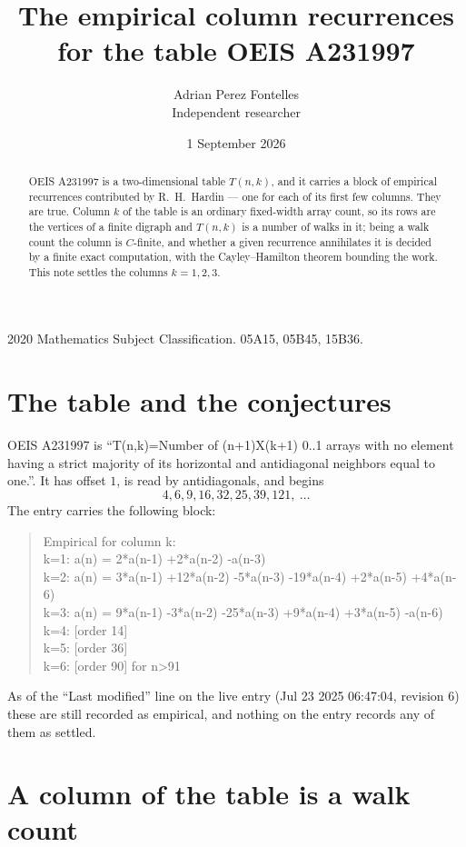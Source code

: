 \documentclass[11pt,a4paper]{article}
\title{The empirical column recurrences for the table OEIS A231997}
\author{Adrian Perez Fontelles\\ \small Independent researcher}
\date{1 September 2026}
\theoremstyle{plain}
\theoremstyle{definition}
\begin{document}
\maketitle

\begin{abstract}
OEIS A231997 is a two-dimensional table $T(n,k)$, and it carries a block of empirical
recurrences contributed by R.~H.~Hardin --- one for each of its first few columns. They are
true. Column $k$ of the table is an ordinary fixed-width array count, so its rows are the
vertices of a finite digraph and $T(n,k)$ is a number of walks in it; being a walk count the
column is $C$-finite, and whether a given recurrence annihilates it is decided by a finite
exact computation, with the Cayley--Hamilton theorem bounding the work. This note settles the columns $k=1, 2, 3$.
\end{abstract}

\noindent\small 2020 Mathematics Subject Classification. 05A15, 05B45, 15B36.\normalsize

\section{The table and the conjectures}

OEIS A231997 is ``T(n,k)=Number of (n+1)X(k+1) 0..1 arrays with no element having a strict majority of its horizontal and antidiagonal neighbors equal to one.''. It has offset $1$, is
read by antidiagonals, and begins
\[
4, 6, 9, 16, 32, 25, 39, 121,\ \dots
\]
The entry carries the following block:
\begin{quote}\small
Empirical for column k:\\
k=1: a(n) = 2*a(n-1) +2*a(n-2) -a(n-3)\\
k=2: a(n) = 3*a(n-1) +12*a(n-2) -5*a(n-3) -19*a(n-4) +2*a(n-5) +4*a(n-6)\\
k=3: a(n) = 9*a(n-1) -3*a(n-2) -25*a(n-3) +9*a(n-4) +3*a(n-5) -a(n-6)\\
k=4: [order 14]\\
k=5: [order 36]\\
k=6: [order 90] for n>91\\
\end{quote}
As of the ``Last modified'' line on the live entry (Jul 23 2025 06:47:04, revision 6) these are still
recorded as empirical, and nothing on the entry records any of them as settled.

\section{A column of the table is a walk count}
\end{document}
